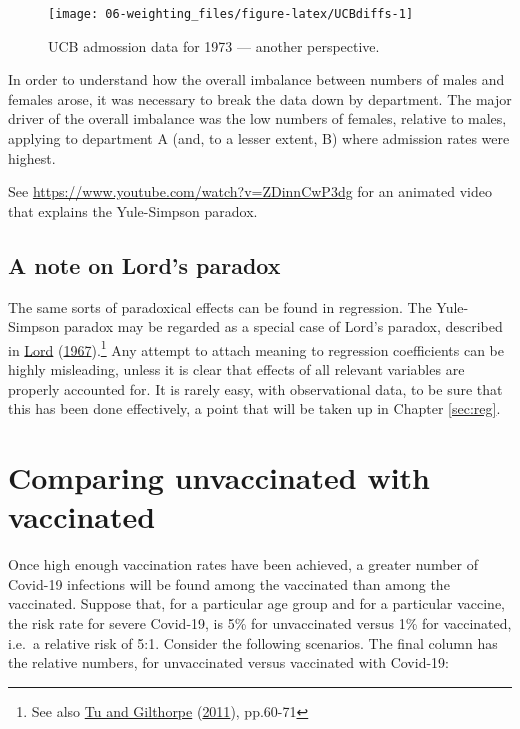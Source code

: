 \documentclass[
  10pt,
  b5paper]{book}
\begin{document}
\begin{figure}[H]

{\centering \texttt{[image: 06-weighting\_files/figure-latex/UCBdiffs-1]} 

}

\caption{UCB admossion data for 1973 --- another perspective.}\label{fig:UCBdiffs}
\end{figure}

In order to understand how the overall imbalance between
numbers of males and females arose, it was necessary to
break the data down by department. The major driver
of the overall imbalance was the low numbers of females,
relative to males, applying to department A (and, to a
lesser extent, B) where admission rates were highest.

See \url{https://www.youtube.com/watch?v=ZDinnCwP3dg}
for an animated video that explains the Yule-Simpson
paradox.

\hypertarget{a-note-on-lords-paradox}{%
\subsection*{A note on Lord's paradox}\label{a-note-on-lords-paradox}}

The same sorts of paradoxical effects can be found in regression.
The Yule-Simpson paradox may be regarded as a special case of Lord's
paradox, described in \protect\hyperlink{ref-lord1967paradox}{Lord} (\protect\hyperlink{ref-lord1967paradox}{1967}).\footnote{See also \protect\hyperlink{ref-tu2011statistical}{Tu and Gilthorpe} (\protect\hyperlink{ref-tu2011statistical}{2011}),
  pp.60-71} Any attempt to attach meaning to regression
coefficients can be highly misleading, unless it is clear
that effects of all relevant variables are properly
accounted for. It is rarely easy, with observational data, to be
sure that this has been done effectively, a point that will be
taken up in Chapter \ref{sec:reg}.

\hypertarget{comparing-unvaccinated-with-vaccinated}{%
\section{Comparing unvaccinated with vaccinated}\label{comparing-unvaccinated-with-vaccinated}}

Once high enough vaccination rates have been achieved, a greater
number of Covid-19 infections will be found among the vaccinated
than among the vaccinated. Suppose that, for a particular age
group and for a particular vaccine, the risk rate for severe
Covid-19, is 5\% for unvaccinated versus 1\% for vaccinated,
i.e.~a relative risk of 5:1. Consider the following scenarios.
The final column has the relative numbers, for unvaccinated
versus vaccinated with Covid-19:
\end{document}
